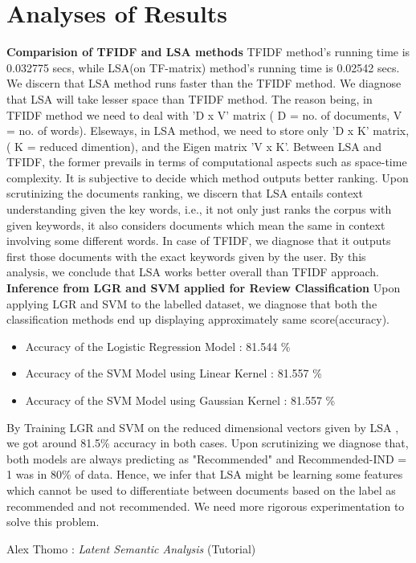 \documentclass[a4paper, 12pt]{article}
\begin{document}
\section{Analyses of Results}
\textbf{Comparision of TFIDF and LSA methods}\newline
TFIDF method's running time is 0.032775 secs, while LSA(on TF-matrix) method's running time is 0.02542 secs. We discern that LSA method runs faster than the TFIDF method. We diagnose that LSA will take lesser space than TFIDF method. The reason being, in TFIDF method we need to deal with 'D x V' matrix ( D = no. of documents, V = no. of words). Elseways, in LSA method, we need to store only 'D x K' matrix, ( K = reduced dimention), and the Eigen matrix 'V x K'. Between LSA and TFIDF, the former prevails in terms of computational aspects such as space-time complexity. It is subjective to decide which method outputs better ranking. Upon scrutinizing the documents ranking, we discern that LSA entails context understanding given the key words, i.e., it not only just ranks the corpus with given keywords, it also considers documents which mean the same in context involving some different words. In case of TFIDF, we diagnose that it outputs first those documents with the exact keywords given by the user. By this analysis, we conclude that LSA works better overall than TFIDF approach.
\newline \newline
\textbf{Inference from LGR and SVM applied for Review Classification}\newline
Upon applying LGR and SVM to the labelled dataset, we diagnose that both the classification methods end up displaying approximately same score(accuracy).
\begin{itemize}
    \item Accuracy of the Logistic Regression Model : 81.544 \%
    \item Accuracy of the SVM Model using Linear Kernel : 81.557 \%
    \item Accuracy of the SVM Model using Gaussian Kernel : 81.557 \%
\end{itemize}
By Training LGR and SVM on the reduced dimensional vectors given by LSA , we got around 81.5\% accuracy in both cases. Upon scrutinizing we diagnose that, both models are always predicting as "Recommended" and Recommended-IND = 1 was in 80\% of data. Hence, we infer that LSA might be learning some features which cannot be used to differentiate between documents based on the label as recommended and not recommended. We need more rigorous experimentation to solve this problem.
\begin{thebibliography}{9}
	

 Alex Thomo : \emph{Latent Semantic Analysis} (Tutorial)

\end{thebibliography}
\end{document}
